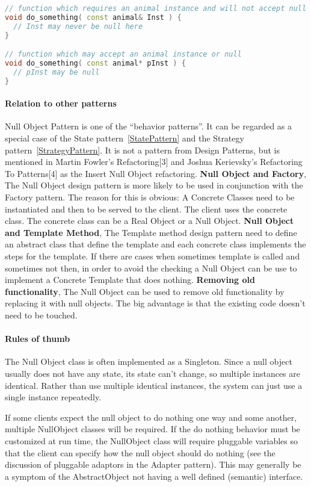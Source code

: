 \documentclass{book}
\begin{document}
\begin{lstlisting}[caption={Null Object Pattern sample code}, language=C++]
// function which requires an animal instance and will not accept null
void do_something( const animal& Inst ) {
  // Inst may never be null here
}

// function which may accept an animal instance or null
void do_something( const animal* pInst ) {
  // pInst may be null
}
\end{lstlisting}

\paragraph{Relation to other patterns} Null Object Pattern is one of the ``behavior patterns''. It can be regarded as a special case of
the State pattern~\ref{StatePattern} and the Strategy pattern~\ref{StrategyPattern}.
It is not a pattern from Design Patterns, but is mentioned in Martin Fowler's Refactoring[3] and Joshua Kerievsky's Refactoring To Patterns[4] as the Insert Null Object refactoring.
\textbf{Null Object and Factory},
The Null Object design pattern is more likely to be used in conjunction with the Factory pattern. The reason for this is obvious: A Concrete Classes need to be instantiated and then to be served to the client. The client uses the concrete class. The concrete class can be a Real Object or a Null Object.
\textbf{Null Object and Template Method},
The Template method design pattern need to define an abstract class that define the template and each concrete class implements the steps for the template. If there are cases when sometimes template is called and sometimes not then, in order to avoid the checking a Null Object can be use to implement a Concrete Template that does nothing.
\textbf{Removing old functionality},
The Null Object can be used to remove old functionality by replacing it with null objects. The big advantage is that the existing code doesn't need to be touched.
\paragraph{Rules of thumb}\mbox{}
    The Null Object class is often implemented as a Singleton. Since a null object usually does not have any state, its state can't change, so multiple instances are identical.
    Rather than use multiple identical instances, the system can just use a single instance repeatedly.

    If some clients expect the null object to do nothing one way and some another, multiple NullObject classes will be required.
    If the do nothing behavior must be customized at run time,
    the NullObject class will require pluggable variables so that the client can specify how the null object should do nothing (see the discussion of pluggable adaptors in the Adapter pattern).
    This may generally be a symptom of the AbstractObject not having a well defined (semantic) interface.
\end{document}
